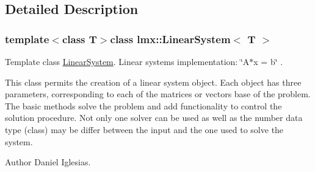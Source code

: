 \subsection{Detailed Description}
\subsubsection*{template$<$class T$>$class lmx\-::\-Linear\-System$<$ T $>$}

Template class \hyperlink{classlmx_1_1LinearSystem}{Linear\-System}. Linear systems implementation\-: \char`\"{}\-A$\ast$x = b\char`\"{} . 

This class permits the creation of a linear system object. Each object has three parameters, corresponding to each of the matrices or vectors base of the problem. The basic methods solve the problem and add functionality to control the solution procedure. Not only one solver can be used as well as the number data type (class) may be differ between the input and the one used to solve the system.

\begin{DoxyAuthor}{Author}
Daniel Iglesias. 
\end{DoxyAuthor}


